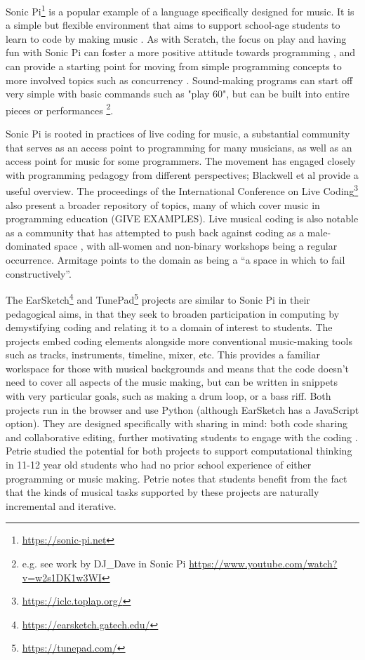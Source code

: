 Sonic Pi\footnote{\url{https://sonic-pi.net}} is a popular example of a language specifically designed for music. It is a simple but flexible environment that aims to support school-age students to learn to code by making music \cite{aaron_sonic_2016}. As with Scratch, the focus on play and having fun with Sonic Pi can foster a more positive attitude towards programming \cite{petri_sonicpi_2022}, and can provide a starting point for moving from simple programming concepts to more involved topics such as concurrency \cite{traversaro_hearplay_2024}. Sound-making programs can start off very simple with basic commands such as "play 60", but can be built into entire pieces or performances \footnote{e.g. see work by DJ\_Dave in Sonic Pi \url{https://www.youtube.com/watch?v=w2s1DK1w3WI}}. 

Sonic Pi is rooted in practices of live coding for music, a substantial community that serves as an access point to programming for many musicians, as well as an access point for music for some programmers. The movement has engaged closely with programming pedagogy from different perspectives; Blackwell et al \cite{blackwell_livecoding_2022} provide a useful overview. The proceedings of the International Conference on Live Coding\footnote{\url{https://iclc.toplap.org/}} also present a broader repository of topics, many of which cover music in programming education (GIVE EXAMPLES). Live musical coding is also notable as a community that has attempted to push back against coding as a male-dominated space \cite{blackwell_livecoding_2022}, with all-women and non-binary workshops being a regular occurrence. Armitage \cite{armitage_spaces_2018} points to the domain as being a ``a space in which to fail constructively''.

The EarSketch\footnote{\url{https://earsketch.gatech.edu/}} \cite{engelman_earsketch_2017} and TunePad\footnote{\url{https://tunepad.com/}} projects are similar to Sonic Pi in their pedagogical aims, in that they seek to broaden participation in computing by demystifying coding and relating it to a domain of interest to students. The projects embed coding elements alongside more conventional music-making tools such as tracks, instruments, timeline, mixer, etc.  This provides a familiar workspace for those with musical backgrounds and means that the code doesn't need to cover all aspects of the music making, but can be written in snippets with very particular goals, such as making a drum loop, or a bass riff. Both projects run in the browser and use Python (although EarSketch has a JavaScript option). They are designed specifically with sharing in mind: both code sharing and collaborative editing, further motivating students to engage with the coding \cite{freeman_earsketch_2019}. Petrie \citep{petrie_ct_2024} studied the potential for both projects to support computational thinking in 11-12 year old students who had no prior school experience of either programming or music making. Petrie notes that students benefit from the fact that the kinds of musical tasks supported by these projects are naturally incremental and iterative.

